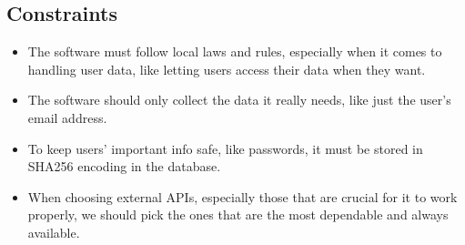 \subsection{Constraints}

\begin{itemize}
    \item The software must follow local laws and rules, especially when it comes to handling user data, like letting users access their data when they want.
    \item The software should only collect the data it really needs, like just the user's email address.
    \item To keep users' important info safe, like passwords, it must be stored in SHA256 encoding in the database.
    \item When choosing external APIs, especially those that are crucial for it to work properly, we should pick the ones that are the most dependable and always available.
\end{itemize}